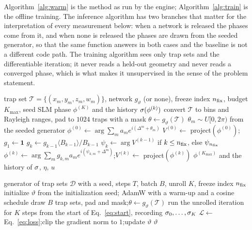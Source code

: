 Algorithm~\ref{alg:warm} is the method as run by the engine; Algorithm~\ref{alg:train} is the offline training. The inference algorithm has two branches that matter for the interpretation of every measurement below: when a network is released the phases come from it, and when none is released the phases are drawn from the seeded generator, so that the same function answers in both cases and the baseline is not a different code path. The training algorithm sees only trap sets and the differentiable iteration; it never reads a held-out geometry and never reads a converged phase, which is what makes it unsupervised in the sense of the problem statement.

\begin{algorithm}[t]
\caption{Learned warm start for phase-fixed WGS (inference and run).}\label{alg:warm}
\begin{algorithmic}[1]
\Require trap set $\mathcal T=\{(x_m,y_m,z_m,w_m)\}$, network $g_\vartheta$ (or none), freeze index $n_{\mathrm{fix}}$, budget $K_{\max}$, seed
\Ensure SLM phase $\phi^{(K)}$ and the history $\sigma(\phi^{(k)})$
\State convert $\mathcal T$ to bins and Rayleigh ranges, pad to $1024$ traps with a mask
 $\theta\gets g_\vartheta(\mathcal T)$ \Else{} $\theta_m\sim U[0,2\pi)$ from the seeded generator \EndIf
\State $\phi^{(0)}\gets\arg\sum_ma_me^{i(\Delta^m+\theta_m)}$ 
\State $V^{(0)}\gets$ project$(\phi^{(0)})$;\quad $g_1\gets\mathbf 1$
   $g_k\gets g_{k-1}\langle B_{k-1}\rangle/B_{k-1}$ \EndIf {}
  \State $\psi_k\gets\arg V^{(k-1)}$ if $k\le n_{\mathrm{fix}}$, else $\psi_{n_{\mathrm{fix}}}$ 
  \State $\phi^{(k)}\gets\arg\sum_mg_{k,m}a_me^{i(\psi_{k,m}+\Delta^m)}$;\quad $V^{(k)}\gets$ project$(\phi^{(k)})$ 
\EndFor
\State \Return $\phi^{(K_{\max})}$ and the history of $\sigma$, $\eta$, $u$
\end{algorithmic}
\end{algorithm}

\begin{algorithm}[t]
\caption{Unsupervised training of the warm-start network through the unrolled iteration.}\label{alg:train}
\begin{algorithmic}[1]
\Require generator of trap sets $\mathcal D$ with a seed, steps $T$, batch $B$, unroll $K$, freeze index $n_{\mathrm{fix}}$
\State initialize $\vartheta$ from the initialization seed; AdamW with a warm-up and a cosine schedule
  \State draw $B$ trap sets, pad and mask;\quad $\theta\gets g_\vartheta(\mathcal T)$
  \State run the unrolled iteration for $K$ steps from the start of Eq.~\eqref{eq:start}, recording $\sigma_0,\dots,\sigma_K$
  \State $\mathcal L\gets$ Eq.~\eqref{eq:loss};\quad clip the gradient norm to $1$;\quad update $\vartheta$
\EndFor
\State \Return $\vartheta$ 
\end{algorithmic}
\end{algorithm}

